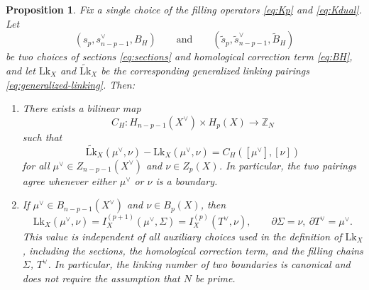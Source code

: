 \documentclass[10pt,a4paper]{amsart}
\newtheorem{prop}{Proposition}
\newcommand{\Lk}{\mathrm{Lk}}
\begin{document}
\begin{prop}
	\label{prop:choice-dependence}
	Fix a single choice of the filling operators \eqref{eq:Kp} and \eqref{eq:Kdual}. Let
	\begin{equation}
		(s_p,s^\vee_{n-p-1},B_H)
		\qquad\text{and}\qquad
		(\widetilde s_p,\widetilde s^\vee_{n-p-1},\widetilde B_H)
	\end{equation}
	be two choices of sections \eqref{eq:sections} and homological correction term
	\eqref{eq:BH}, and let \(\Lk_X\) and \(\widetilde{\Lk}_X\) be the corresponding
	generalized linking pairings \eqref{eq:generalized-linking}. Then:
	\begin{enumerate}[label=(\roman*)]
		\item\label{prop:choice-dependence-item1}
		There exists a bilinear map
		\begin{equation}
			C_H:H_{n-p-1}(X^\vee)\times H_p(X)\to \mathbb Z_N
			\label{eq:DeltaH}
		\end{equation}
		such that
		\begin{equation}
			\widetilde{\Lk}_X(\mu^\vee,\nu)-\Lk_X(\mu^\vee,\nu)
			=
			C_H\left([\mu^\vee],[\nu]\right)
			\label{eq:choice-dependence}
		\end{equation}
		for all
		\(\mu^\vee\in Z_{n-p-1}(X^\vee)\) and \(\nu\in Z_p(X)\). In particular, the two
		pairings agree whenever either \(\mu^\vee\) or \(\nu\) is a boundary.
		
		\item\label{propItem:bdryLink}
		If \(\mu^\vee\in B_{n-p-1}(X^\vee)\) and \(\nu\in B_p(X)\), then
		\begin{equation}
			\Lk_X(\mu^\vee,\nu)
			=
			I_X^{(p+1)}\left(\mu^\vee,\Sigma\right)
			=
			I_X^{(p)}\left(T^\vee,\nu\right),
			\qquad
			\partial\Sigma=\nu,\ \partial T^\vee=\mu^\vee.
			\label{eq:boundary-linking-canonical-merged}
		\end{equation}
		This value is independent of all auxiliary choices used in the definition of
		\(\Lk_X\), including the sections, the homological correction term, and the
		filling chains \(\Sigma\), \(T^\vee\). In particular, the linking number of two
		boundaries is canonical and does not require the assumption that \(N\) be
		prime.
	\end{enumerate}
\end{prop}
\end{document}
